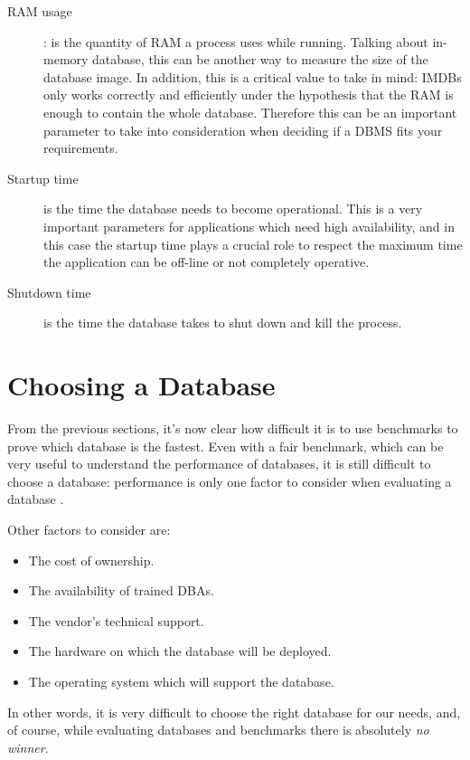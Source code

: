 \begin{description}
	\item[RAM usage]: is the quantity of RAM a process uses while running. Talking about in-memory database, this can be another way to measure the size of the database image. In addition, this is a critical value to take in mind: IMDBs only works correctly and efficiently under the hypothesis that the RAM is enough to contain the whole database. Therefore this can be an important parameter to take into consideration when deciding if a DBMS fits your requirements.
		
	\item[Startup time] is the time the database needs to become operational. This is a very important parameters for applications which need high availability, and in this case the startup time plays a crucial role to respect the maximum time the application can be off-line or not completely operative. 
	
	\item[Shutdown time] is the time the database takes to shut down and kill the process.
	
\end{description}
	
	\section{Choosing a Database}
From the previous sections, it's now clear how difficult it is to use benchmarks to prove which database is the fastest. Even with a fair benchmark, which can be very useful to understand the performance of databases, it is still difficult to choose a database: performance is only one factor to consider when evaluating a database \cite{burleson}. 

Other factors to consider are:
\begin{itemize}
	\item The cost of ownership.
	\item The availability of trained DBAs.
	\item The vendor's technical support.	
	\item The hardware on which the database will be deployed.
	\item The operating system which will support the database.
\end{itemize}

In other words, it is very difficult to choose the right database for our needs, and, of course, while evaluating databases and benchmarks there is absolutely \emph{no winner}.

